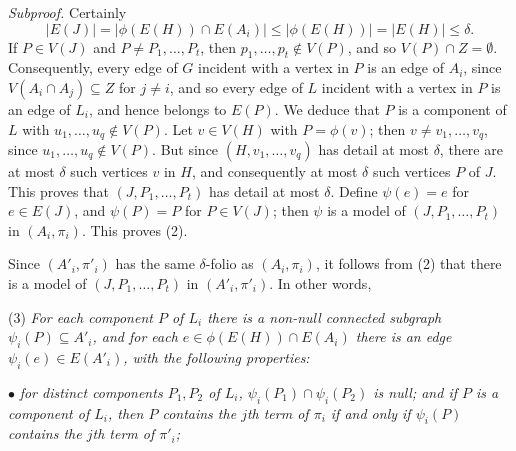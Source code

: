\textit{Subproof.} Certainly
\begin{equation*}
|E(J)| = |\phi(E(H)) \cap E(A_i)| \le |\phi(E(H))| = |E(H)| \le \delta.
\end{equation*}
If $P \in V(J)$ and $P \ne P_1, \ldots, P_t$, then $p_1, \ldots, p_t \notin V(P)$, and so $V(P) \cap Z = \emptyset$. Consequently, every edge of $G$ incident with a vertex in $P$ is an edge of $A_i$, since $V(A_i \cap A_j) \subseteq Z$ for $j \ne i$, and so every edge of $L$ incident with a vertex in $P$ is an edge of $L_i$, and hence belongs to $E(P)$. We deduce that $P$ is a component of $L$ with $u_1, \ldots, u_q \notin V(P)$. Let $v \in V(H)$ with $P = \phi(v)$; then $v \ne v_1, \ldots, v_q$, since $u_1, \ldots, u_q \notin V(P)$. But since $(H, v_1, \ldots, v_q)$ has detail at most $\delta$, there are at most $\delta$ such vertices $v$ in $H$, and consequently at most $\delta$ such vertices $P$ of $J$. This proves that $(J, P_1, \ldots, P_t)$ has detail at most $\delta$. Define $\psi(e) = e$ for $e \in E(J)$, and $\psi(P) = P$ for $P \in V(J)$; then $\psi$ is a model of $(J, P_1, \ldots, P_t)$ in $(A_i, \pi_i)$. This proves (2).

Since $(A'_i, \pi'_i)$ has the same $\delta$-folio as $(A_i, \pi_i)$, it follows from (2) that there is a model of $(J, P_1, \ldots, P_t)$ in $(A'_i, \pi'_i)$. In other words,

\hspace*{12pt}(3) \textit{For each component $P$ of $L_i$ there is a non-null connected subgraph $\psi_i(P) \subseteq A'_i$, and for each $e \in \phi(E(H)) \cap E(A_i)$ there is an edge $\psi_i(e) \in E(A'_i)$, with the following properties:}

\hspace*{12pt}$\bullet$ \textit{for distinct components $P_1, P_2$ of $L_i$, $\psi_i(P_1) \cap \psi_i(P_2)$ is null; and if $P$ is a component of $L_i$, then $P$ contains the $j$th term of $\pi_i$ if and only if $\psi_i(P)$ contains the $j$th term of $\pi'_i$;}
